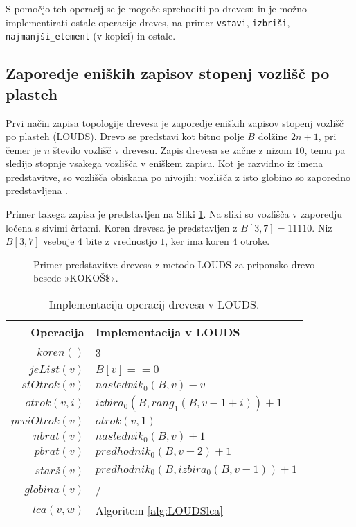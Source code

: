 S pomočjo teh operacij se je mogoče sprehoditi po drevesu in je možno implementirati ostale operacije dreves, na primer \texttt{vstavi}, \texttt{izbriši}, \texttt{najmanjši\_element} (v kopici) in ostale.

\subsection{Zaporedje eniških zapisov stopenj vozlišč po plasteh}\label{sec:LOUDS}

Prvi način zapisa topologije drevesa je zaporedje eniških zapisov stopenj vozlišč po plasteh (LOUDS). Drevo se predstavi kot bitno polje $B$ dolžine $2n+1$, pri čemer je $n$ število vozlišč v drevesu. Zapis drevesa se začne z nizom $10$, temu pa sledijo stopnje vsakega vozlišča v eniškem zapisu. Kot je razvidno iz imena predstavitve, so vozlišča obiskana po nivojih: vozlišča z isto globino so zaporedno predstavljena \cite{Navarro2016}.

Primer takega zapisa je predstavljen na Sliki \ref{fig:LOUDS}. Na sliki so vozlišča v zaporedju ločena s sivimi črtami. Koren drevesa je predstavljen z $B[3,7]=11110$. Niz $B[3,7]$ vsebuje 4 bite z vrednostjo $1$, ker ima koren $4$ otroke.

\begin{figure}[htb]
    \begin{center}
        
        \caption{Primer predstavitve drevesa z metodo LOUDS za priponsko drevo besede »KOKOŠ$\$$«.} 
        \label{fig:LOUDS}
    \end{center}
\end{figure}

\begin{table}[htb]
    \centering
    \caption{Implementacija operacij drevesa v LOUDS.}
    \begin{tabular}{r|l}
\textbf{Operacija}& \textbf{Implementacija v LOUDS} \\\hline
         $koren()$& 3\\
         $jeList(v)$& $B[v]==0$\\
         $stOtrok(v)$& $naslednik_0(B,v)-v$\\
         $otrok(v,i)$& $izbira_0(B, rang_1(B, v - 1 + i))+1$\\
         $prviOtrok(v)$& $otrok(v,1)$\\
         $nbrat(v)$& $naslednik_0(B,v)+1$ \\
         $pbrat(v)$& $predhodnik_0(B,v-2)+1$ \\
         $star$\textit{š}$(v)$& $predhodnik_0(B,izbira_0(B,v-1))+1$ \\
         $globina(v)$& / \\
         $lca(v,w)$&  Algoritem \ref{alg:LOUDSlca}\\

    \end{tabular}
    \label{tab:LOUDSop}
\end{table}

